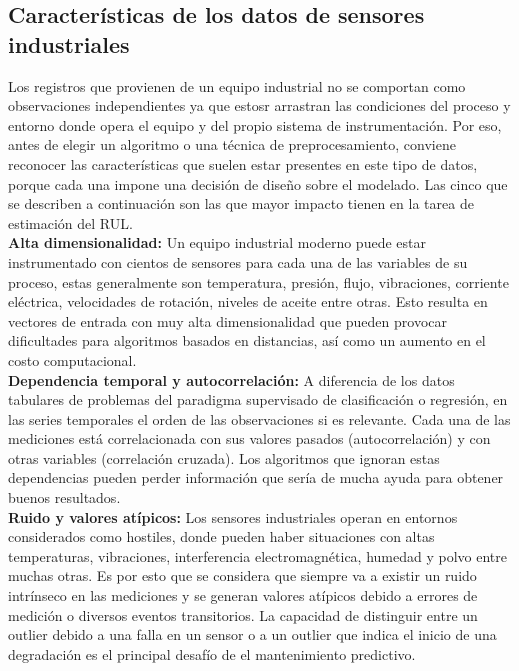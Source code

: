 \subsection{Características de los datos de sensores industriales}

Los registros que provienen de un equipo industrial no se comportan como observaciones independientes ya que estosr arrastran las condiciones del proceso y entorno donde opera el equipo y del propio sistema de instrumentación. Por eso, antes de elegir un algoritmo o una técnica de preprocesamiento, conviene reconocer las características que suelen estar presentes en este tipo de datos, porque cada una impone una decisión de diseño sobre el modelado. Las cinco que se describen a continuación son las que mayor impacto tienen en la tarea de estimación del RUL.\\[.15cm]

\textbf{Alta dimensionalidad:} Un equipo industrial moderno puede estar instrumentado con cientos de sensores para cada una de las variables de su proceso, estas generalmente son temperatura, presión, flujo, vibraciones, corriente eléctrica, velocidades de rotación, niveles de aceite entre otras. Esto resulta en vectores de entrada con muy alta dimensionalidad que pueden provocar dificultades para algoritmos basados en distancias, así como un aumento en el costo computacional.\\[.15cm]

\textbf{Dependencia temporal y autocorrelación:} A diferencia de los datos tabulares de problemas del paradigma supervisado de clasificación o regresión, en las series temporales el orden de las observaciones si es relevante. Cada una de las mediciones está correlacionada con sus valores pasados (autocorrelación) y con otras variables (correlación cruzada). Los algoritmos que ignoran estas dependencias pueden perder información que sería de mucha ayuda para obtener buenos resultados.\\[.15cm]

\textbf{Ruido y valores atípicos:} Los sensores industriales operan en entornos considerados como hostiles, donde pueden haber situaciones con altas temperaturas, vibraciones, interferencia electromagnética, humedad y polvo entre muchas otras. Es por esto que se considera que siempre va a existir un ruido intrínseco en las mediciones y se generan valores atípicos debido a errores de medición o diversos eventos transitorios. La capacidad de distinguir entre un outlier debido a una falla en un sensor o a un outlier que indica el inicio de una degradación es el principal desafío de el mantenimiento predictivo.\\[.15cm]

